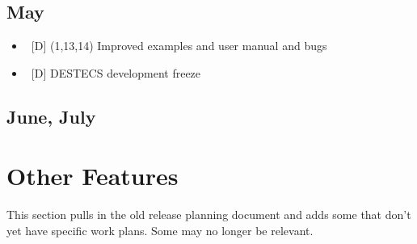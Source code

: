 \documentclass{overturerep}
\newenvironment{denseitemize}
  {\begin{itemize}\setlength{\itemsep}{0pt}\setlength{\parskip}{0pt}\setlength{\parsep}{0pt}}
  {\end{itemize}}
\newcommand{\developer}[1]{{\scriptsize \fbox{#1}}}
\begin{document}
\subsection{May} 
\begin{denseitemize}
\item\ [D] (1,13,14) Improved examples and user manual and bugs \developer{ARI}
\item\ [D] DESTECS development freeze
\end{denseitemize}

\subsection{June, July}
\begin{denseitemize}
\end{denseitemize}




\section{Other Features}
This section pulls in the old release planning document and adds some
that don't yet have specific work plans.  Some may no longer be
relevant.
\end{document}
